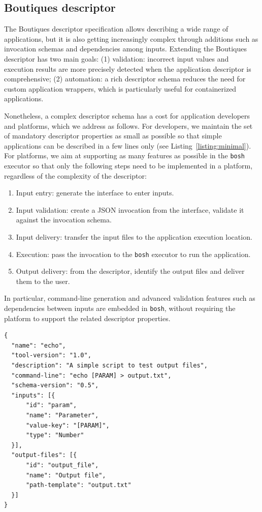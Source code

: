 \documentclass[a4paper,num-refs]{oup-contemporary}
\newcommand{\boutiques}{Boutiques\xspace}
\begin{document}
\subsection{\boutiques descriptor}

The \boutiques descriptor specification allows describing a wide range
of applications, but it is also getting increasingly complex through
additions such as invocation schemas and dependencies among
inputs. Extending the \boutiques descriptor has two main goals: (1)
validation: incorrect input values and execution results are more
precisely detected when the application descriptor is
comprehensive; (2) automation: a rich descriptor schema reduces the need for
custom application wrappers, which is particularly useful for containerized
applications.

Nonetheless, a complex descriptor schema has a cost for application
developers and platforms, which we address as follows. For developers,
we maintain the set of mandatory descriptor properties as small as
possible so that simple applications can be described in a few lines
only (see Listing~\ref{listing:minimal}). For platforms, we aim at
supporting as many features as possible in the \texttt{bosh} executor
so that only the following steps need to be implemented in a platform,
regardless of the complexity of the descriptor:
\begin{enumerate}
  \item Input entry: generate the interface to enter inputs.
  \item Input validation: create a JSON invocation from the interface,
    validate it against the invocation schema.
  \item Input delivery: transfer the input files to the application
    execution location.
  \item Execution: pass the invocation to the \texttt{bosh} executor to run the application.
  \item Output delivery: from the descriptor, identify the output files
    and deliver them to the user.
\end{enumerate}
In particular, command-line generation and advanced validation
features such as dependencies between inputs are embedded in
\texttt{bosh}, without requiring the platform to support the related
descriptor properties.
\begin{listing}
\begin{verbatim}
{
  "name": "echo",
  "tool-version": "1.0",
  "description": "A simple script to test output files",
  "command-line": "echo [PARAM] > output.txt",
  "schema-version": "0.5",
  "inputs": [{
      "id": "param",
      "name": "Parameter",
      "value-key": "[PARAM]",
      "type": "Number"
  }],
  "output-files": [{
      "id": "output_file",
      "name": "Output file",
      "path-template": "output.txt"
  }]
}
\end{verbatim}
\caption{A minimal \boutiques descriptor.} 
\label{listing:minimal}
\end{listing}
\end{document}
